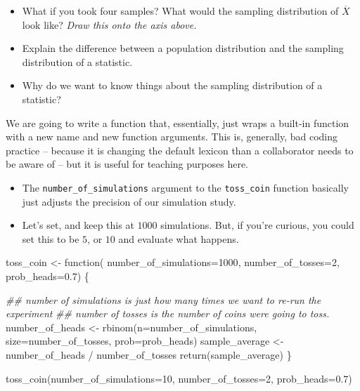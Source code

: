 \documentclass[
  letterpaper,
  DIV=11,
  numbers=noendperiod]{scrreprt}
\newenvironment{Shaded}{\begin{snugshade}}{\end{snugshade}}
\newcommand{\AttributeTok}[1]{\textcolor[rgb]{0.40,0.45,0.13}{#1}}
\newcommand{\ControlFlowTok}[1]{\textcolor[rgb]{0.00,0.23,0.31}{#1}}
\newcommand{\DecValTok}[1]{\textcolor[rgb]{0.68,0.00,0.00}{#1}}
\newcommand{\DocumentationTok}[1]{\textcolor[rgb]{0.37,0.37,0.37}{\textit{#1}}}
\newcommand{\FloatTok}[1]{\textcolor[rgb]{0.68,0.00,0.00}{#1}}
\newcommand{\FunctionTok}[1]{\textcolor[rgb]{0.28,0.35,0.67}{#1}}
\newcommand{\NormalTok}[1]{\textcolor[rgb]{0.00,0.23,0.31}{#1}}
\newcommand{\OtherTok}[1]{\textcolor[rgb]{0.00,0.23,0.31}{#1}}
\newcommand{\SpecialCharTok}[1]{\textcolor[rgb]{0.37,0.37,0.37}{#1}}
\providecommand{\tightlist}{%
  \setlength{\itemsep}{0pt}\setlength{\parskip}{0pt}}\usepackage{longtable,booktabs,array}
\begin{document}
\begin{itemize}
\tightlist
\item
  What if you took four samples? What would the sampling distribution of
  \(\overline{X}\) look like? \emph{Draw this onto the axis above.}
\item
  Explain the difference between a population distribution and the
  sampling distribution of a statistic.
\item
  Why do we want to know things about the sampling distribution of a
  statistic?
\end{itemize}

We are going to write a function that, essentially, just wraps a
built-in function with a new name and new function arguments. This is,
generally, bad coding practice -- because it is changing the default
lexicon than a collaborator needs to be aware of -- but it is useful for
teaching purposes here.

\begin{itemize}
\tightlist
\item
  The \texttt{number\_of\_simulations} argument to the
  \texttt{toss\_coin} function basically just adjusts the precision of
  our simulation study.
\item
  Let's set, and keep this at \(1000\) simulations. But, if you're
  curious, you could set this to be \(5\), or \(10\) and evaluate what
  happens.
\end{itemize}

\begin{Shaded}
\begin{Highlighting}[]
\NormalTok{toss\_coin }\OtherTok{\textless{}{-}} \ControlFlowTok{function}\NormalTok{(}
    \AttributeTok{number\_of\_simulations=}\DecValTok{1000}\NormalTok{, }
    \AttributeTok{number\_of\_tosses=}\DecValTok{2}\NormalTok{, }
    \AttributeTok{prob\_heads=}\FloatTok{0.7}\NormalTok{) \{ }
  
  \DocumentationTok{\#\# number of simulations is just how many times we want to re{-}run the experiment}
  \DocumentationTok{\#\# number of tosses is the number of coins we\textquotesingle{}re going to toss.}
\NormalTok{  number\_of\_heads }\OtherTok{\textless{}{-}} \FunctionTok{rbinom}\NormalTok{(}\AttributeTok{n=}\NormalTok{number\_of\_simulations, }\AttributeTok{size=}\NormalTok{number\_of\_tosses, }\AttributeTok{prob=}\NormalTok{prob\_heads)}
\NormalTok{  sample\_average  }\OtherTok{\textless{}{-}}\NormalTok{ number\_of\_heads }\SpecialCharTok{/}\NormalTok{ number\_of\_tosses}
  \FunctionTok{return}\NormalTok{(sample\_average)}
\NormalTok{\}}

\FunctionTok{toss\_coin}\NormalTok{(}\AttributeTok{number\_of\_simulations=}\DecValTok{10}\NormalTok{, }\AttributeTok{number\_of\_tosses=}\DecValTok{2}\NormalTok{, }\AttributeTok{prob\_heads=}\FloatTok{0.7}\NormalTok{)}
\end{Highlighting}
\end{Shaded}
\end{document}
